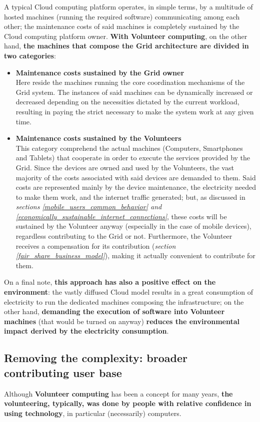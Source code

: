 A typical Cloud computing platform operates, in simple terms, by a multitude of hosted machines (running the required software) communicating among each other; the maintenance costs of said machines is completely sustained by the Cloud computing platform owner. \textbf{With Volunteer computing}, on the other hand, \textbf{the machines that compose the Grid architecture are divided in two categories}:
\begin{itemize}
    \item \textbf{Maintenance costs sustained by the Grid owner}\\
    Here reside the machines running the core coordination mechanisms of the Grid system. The instances of said machines can be dynamically increased or decreased depending on the necessities dictated by the current workload, resulting in paying the strict necessary to make the system work at any given time.
    \item \textbf{Maintenance costs sustained by the Volunteers}\\
    This category comprehend the actual machines (Computers, Smartphones and Tablets) that cooperate in order to execute the services provided by the Grid. Since the devices are owned and used by the Volunteers, the vast majority of the costs associated with said devices are demanded to them. Said costs are represented mainly by the device maintenance, the electricity needed to make them work, and the internet traffic generated; but, as discussed in \textit{sections \ref{mobile_users_common_behavior} and \ref{economically_sustainable_internet_connections}}, these costs will be sustained by the Volunteer anyway (especially in the case of mobile devices), regardless contributing to the Grid or not. Furthermore, the Volunteer receives a compensation for its contribution (\textit{section \ref{fair_share_business_model}}), making it actually convenient to contribute for them.
\end{itemize}

On a final note, \textbf{this approach has also a positive effect on the environment}: the vastly diffused Cloud model results in a great consumption of electricity to run the dedicated machines composing the infrastructure; on the other hand, \textbf{demanding the execution of software into Volunteer machines} (that would be turned on anyway) \textbf{reduces the environmental impact derived by the electricity consumption}.

\subsection{Removing the complexity: broader contributing user base}
Although \textbf{Volunteer computing} has been a concept for many years, \textbf{the volunteering, typically, was done by people with relative confidence in using technology}, in particular (necessarily) computers.


